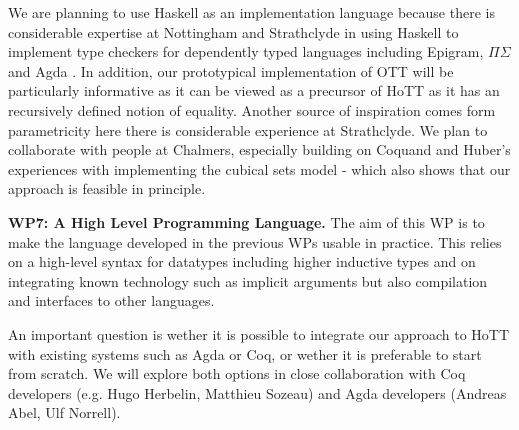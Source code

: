 \documentclass[a4paper,11pt]{article}
\begin{document}
We are planning to use Haskell as an implementation language because
there is considerable expertise at Nottingham and Strathclyde in using
Haskell to implement type checkers for dependently typed languages
including Epigram, $\Pi\Sigma$ and Agda
\cite{alti:checking,easy,alti:pisigma-new}.  In addition, our
prototypical implementation of OTT will be particularly informative as
it can be viewed as a precursor of HoTT as it has an recursively
defined notion of equality. Another source of inspiration comes form parametricity 
here there is considerable experience at Strathclyde.
We plan to collaborate with people at
Chalmers, especially building on Coquand and Huber's experiences with
implementing the cubical sets model - which also shows that our
approach is feasible in principle.



{\bf WP7: A High Level Programming Language.} The aim of this WP is to
make the language developed in the previous WPs usable in
practice. This relies on a high-level syntax for datatypes including
higher inductive types and on integrating known technology such as
implicit arguments but also compilation and interfaces to other
languages.

An important question is wether it is possible to integrate our
approach to HoTT with existing systems such as Agda or Coq, or wether
it is preferable to start from scratch. We will explore both options
in close collaboration with Coq developers (e.g. Hugo Herbelin,
Matthieu Sozeau) and Agda developers (Andreas Abel, Ulf Norrell).

\end{document}
